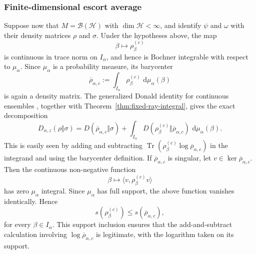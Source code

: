 \documentclass[12pt]{article}
\numberwithin{equation}{section}
\theoremstyle{definition}
\theoremstyle{remark}
\newcommand{\dd}{\,\mathrm d}
\newcommand{\?}{\overset{?}{=}}
\DeclareMathOperator{\Tr}{Tr}
\begin{document}
\subsubsection{Finite-dimensional escort average}
Suppose now that \(M=\mathcal B(\mathcal H)\) with
\(\dim\mathcal H<\infty\), and identify \(\psi\) and \(\omega\) with their
density matrices \(\rho\) and \(\sigma\).  Under the hypotheses above, the
map
\[
  \beta\longmapsto\rho_\beta^{(c)}
\]
is continuous in trace norm on \(I_\alpha\), and hence is Bochner integrable
with respect to \(\mu_\alpha\).  Since \(\mu_\alpha\) is a probability
measure, its barycenter
\begin{equation}
  \overline\rho_{\alpha,c}
  :=
  \int_{I_\alpha}\rho_\beta^{(c)}\,
  \dd\mu_\alpha(\beta)
  \label{eq:escort-barycenter}
\end{equation}
is again a density matrix.  The generalized Donald identity for continuous ensembles
\cite[Lemma~4, Eq.~(16)]{Holevo:2004ots}, together with
Theorem~\ref{thm:fixed-ray-integral}, gives the exact decomposition
\begin{equation}
  D_{\alpha,z}(\rho\Vert\sigma)
  =
  D(\overline\rho_{\alpha,c}\Vert\sigma)
  +
  \int_{I_\alpha}
    D(\rho_\beta^{(c)}\Vert\overline\rho_{\alpha,c})\,
    \dd\mu_\alpha(\beta).
  \label{eq:donald-holevo-escort}
\end{equation}
This is easily seen by adding and subtracting
$\Tr(\rho_\beta^{(c)}\log\overline\rho_{\alpha,c})$ in the integrand and
using the barycenter definition. If $\overline\rho_{\alpha,c}$ is singular, let $v\in \ker \overline\rho_{\alpha,c}$. Then the continuous non-negative function
\begin{equation}
    \beta\longmapsto \langle{v, \rho_\beta^{(c)} v}\rangle
\end{equation}
has zero $\mu_\alpha$ integral. Since $\mu_\alpha$ has full support, the above function vanishes identically. Hence
\begin{equation}
    s(\rho_\beta^{(c)} ) \leq s(\overline\rho_{\alpha,c}),
\end{equation}
for every $\beta\in I_\alpha$. This support inclusion ensures that the add-and-subtract
calculation involving $\log\overline\rho_{\alpha,c}$ is legitimate, with
the logarithm taken on its support.
\end{document}
